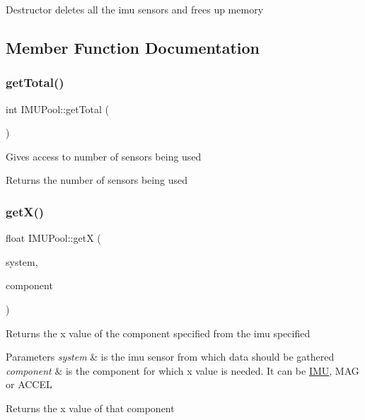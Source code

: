 Destructor deletes all the imu sensors and frees up memory 

\subsection{Member Function Documentation}
\mbox{\label{class_i_m_u_pool_a586d1f4afaea96029a546fd4154db362}} 
\subsubsection{\texorpdfstring{get\+Total()}{getTotal()}}
{\footnotesize\ttfamily int I\+M\+U\+Pool\+::get\+Total (\begin{DoxyParamCaption}{ }\end{DoxyParamCaption})}

Gives access to number of sensors being used \begin{DoxyReturn}{Returns}
the number of sensors being used 
\end{DoxyReturn}
\mbox{\label{class_i_m_u_pool_a36030cdecae6c63053565949615420f6}} 
\subsubsection{\texorpdfstring{get\+X()}{getX()}}
{\footnotesize\ttfamily float I\+M\+U\+Pool\+::getX (\begin{DoxyParamCaption}\item[{unsigned int}]{system,  }\item[{imu\+\_\+comp}]{component }\end{DoxyParamCaption})}

Returns the x value of the component specified from the imu specified 
\begin{DoxyParams}{Parameters}
{\em system} & is the imu sensor from which data should be gathered \\
\hline
{\em component} & is the component for which x value is needed. It can be \hyperlink{class_i_m_u}{I\+MU}, M\+AG or A\+C\+C\+EL \\
\hline
\end{DoxyParams}
\begin{DoxyReturn}{Returns}
the x value of that component 
\end{DoxyReturn}
\mbox{\label{class_i_m_u_pool_a8822803453deb8b844db19fec6aaad13}} 
